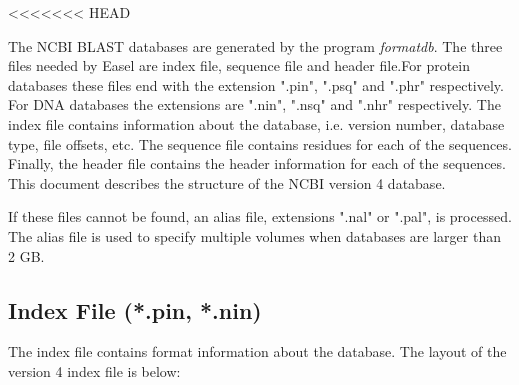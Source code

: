 <<<<<<< HEAD

The NCBI BLAST databases are generated by the program \emph{formatdb}.
The three files needed by Easel are index file, sequence file 
and header file.For protein databases these files end with the extension 
".pin", ".psq" and ".phr" respectively.  For DNA databases the 
extensions are ".nin", ".nsq" and ".nhr" respectively.  The index 
file contains information about the database, i.e. version number, 
database type, file offsets, etc.  The sequence file contains residues
for each of the sequences.  Finally, the header file contains the header 
information for each of the sequences.  This document describes the
structure of the NCBI version 4 database.

If these files cannot be found, an alias file, extensions ".nal" or
 ".pal", is processed.  The alias file is used to specify multiple
volumes when databases are larger than 2 GB.


\subsection{Index File (*.pin, *.nin)}

The index file contains format information about the database.   The 
layout of the version 4 index file is below:

